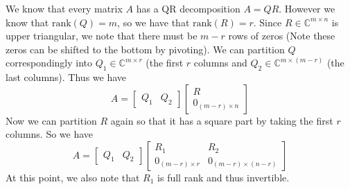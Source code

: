 \documentclass{exam}
\begin{document}
  \begin{solution}
      We know that every matrix $A$ has a QR decomposition $A = QR$. However we know that $\text{rank}(Q) = m$, so we have that $\text{rank}(R) = r$. Since $R \in \mathds{C}^{m \times n}$ is upper triangular, we note that there must be $m-r$ rows of zeros (Note these zeros can be shifted to the bottom by pivoting). We can partition $Q$ correspondingly into $Q_1 \in \mathds{C}^{m \times r}$ (the first $r$ columns and $Q_2 \in \mathds{C}^{m \times (m - r)}$ (the last columns). Thus we have
      \[
          A = 
          \begin{bmatrix}
              Q_1 & Q_2
          \end{bmatrix}
          \begin{bmatrix}
              R \\
              0_{(m-r) \times n}
          \end{bmatrix}
      \]
      Now we can partition $R$ again so that it has a square part by taking the first $r$ columns. So we have
      \[
          A = 
          \begin{bmatrix}
              Q_1 & Q_2
          \end{bmatrix}
          \begin{bmatrix}
              R_1 & R_2 \\
              0_{(m-r) \times r} & 0_{(m-r) \times (n-r)}
          \end{bmatrix}
      \]
      At this point, we also note that $R_1$ is full rank and thus invertible.


\end{solution}
\end{document}
